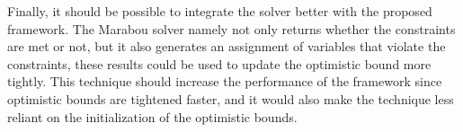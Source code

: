 \documentclass[../main.tex]{subfiles}
\begin{document}
Finally, it should be possible to integrate the solver better with the proposed framework. The Marabou solver namely not only returns whether the constraints are met or not, but it also generates an assignment of variables that violate the constraints, these results could be used to update the optimistic bound more tightly. This technique should increase the performance of the framework since optimistic bounds are tightened faster, and it would also make the technique less reliant on the initialization of the optimistic bounds.
\end{document}
